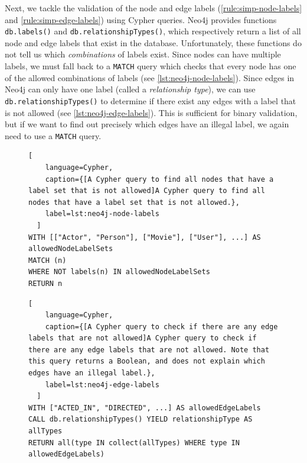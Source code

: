 \documentclass{report}
\theoremstyle{definition}
\begin{document}
Next, we tackle the validation of the node and edge labels (\autoref{rule:simp-node-labels} and \ref{rule:simp-edge-labels}) using Cypher queries. Neo4j provides functions \texttt{db.labels()} and \texttt{db.relationshipTypes()}, which respectively return a list of all node and edge labels that exist in the database. Unfortunately, these functions do not tell us which \emph{combinations} of labels exist. Since nodes can have multiple labels, we must fall back to a \texttt{MATCH} query which checks that every node has one of the allowed combinations of labels (see \autoref{lst:neo4j-node-labels}). Since edges in Neo4j can only have one label (called a \emph{relationship type}), we can use \texttt{db.relationshipTypes()} to determine if there exist any edges with a label that is not allowed (see \autoref{lst:neo4j-edge-labels}). This is sufficient for binary validation, but if we want to find out precisely which edges have an illegal label, we again need to use a \texttt{MATCH} query.

\begin{figure}[H]
  \begin{lstlisting}[
    language=Cypher,
    caption={[A Cypher query to find all nodes that have a label set that is not allowed]A Cypher query to find all nodes that have a label set that is not allowed.},
    label=lst:neo4j-node-labels
  ]
WITH [["Actor", "Person"], ["Movie"], ["User"], ...] AS allowedNodeLabelSets
MATCH (n)
WHERE NOT labels(n) IN allowedNodeLabelSets
RETURN n
  \end{lstlisting}
\end{figure}
\vspace*{-8pt}
\begin{figure}[H]
  \begin{lstlisting}[
    language=Cypher,
    caption={[A Cypher query to check if there are any edge labels that are not allowed]A Cypher query to check if there are any edge labels that are not allowed. Note that this query returns a Boolean, and does not explain which edges have an illegal label.},
    label=lst:neo4j-edge-labels
  ]
WITH ["ACTED_IN", "DIRECTED", ...] AS allowedEdgeLabels
CALL db.relationshipTypes() YIELD relationshipType AS allTypes
RETURN all(type IN collect(allTypes) WHERE type IN allowedEdgeLabels)
  \end{lstlisting}
\end{figure}
\end{document}
